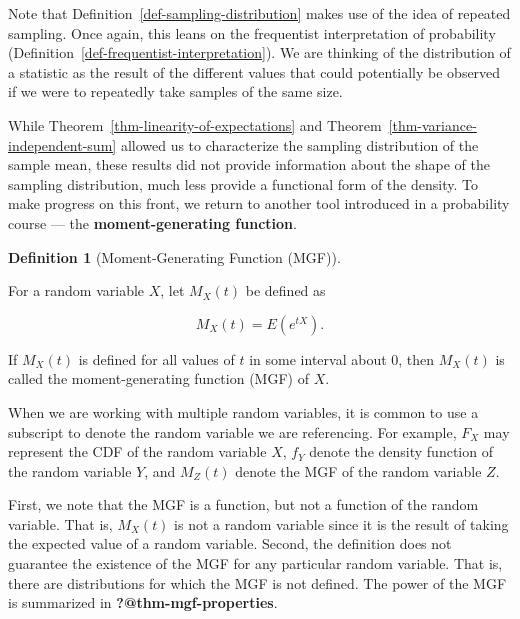 \documentclass[
  letterpaper,
  DIV=11,
  numbers=noendperiod]{scrreprt}
\theoremstyle{definition}
\newtheorem{definition}{Definition}[chapter]
\theoremstyle{definition}
\theoremstyle{plain}
\theoremstyle{remark}
\begin{document}
Note that Definition~\ref{def-sampling-distribution} makes use of the
idea of repeated sampling. Once again, this leans on the frequentist
interpretation of probability
(Definition~\ref{def-frequentist-interpretation}). We are thinking of
the distribution of a statistic as the result of the different values
that could potentially be observed if we were to repeatedly take samples
of the same size.

While Theorem~\ref{thm-linearity-of-expectations} and
Theorem~\ref{thm-variance-independent-sum} allowed us to characterize
the sampling distribution of the sample mean, these results did not
provide information about the shape of the sampling distribution, much
less provide a functional form of the density. To make progress on this
front, we return to another tool introduced in a probability course ---
the \textbf{moment-generating function}.

\begin{definition}[Moment-Generating Function
(MGF)]\protect\hypertarget{def-mgf}{}\label{def-mgf}

For a random variable \(X\), let \(M_X(t)\) be defined as

\[M_X(t) = E\left(e^{tX}\right).\]

If \(M_X(t)\) is defined for all values of \(t\) in some interval about
0, then \(M_X(t)\) is called the moment-generating function (MGF) of
\(X\).

\end{definition}

\begin{tcolorbox}[enhanced jigsaw, title=\textcolor{quarto-callout-note-color}{\faInfo}\hspace{0.5em}{Note}, colbacktitle=quarto-callout-note-color!10!white, titlerule=0mm, toptitle=1mm, breakable, bottomtitle=1mm, colframe=quarto-callout-note-color-frame, opacitybacktitle=0.6, bottomrule=.15mm, arc=.35mm, toprule=.15mm, colback=white, rightrule=.15mm, coltitle=black, leftrule=.75mm, left=2mm, opacityback=0]

When we are working with multiple random variables, it is common to use
a subscript to denote the random variable we are referencing. For
example, \(F_X\) may represent the CDF of the random variable \(X\),
\(f_Y\) denote the density function of the random variable \(Y\), and
\(M_Z(t)\) denote the MGF of the random variable \(Z\).

\end{tcolorbox}

First, we note that the MGF is a function, but not a function of the
random variable. That is, \(M_X(t)\) is not a random variable since it
is the result of taking the expected value of a random variable. Second,
the definition does not guarantee the existence of the MGF for any
particular random variable. That is, there are distributions for which
the MGF is not defined. The power of the MGF is summarized in
\textbf{?@thm-mgf-properties}.
\end{document}
